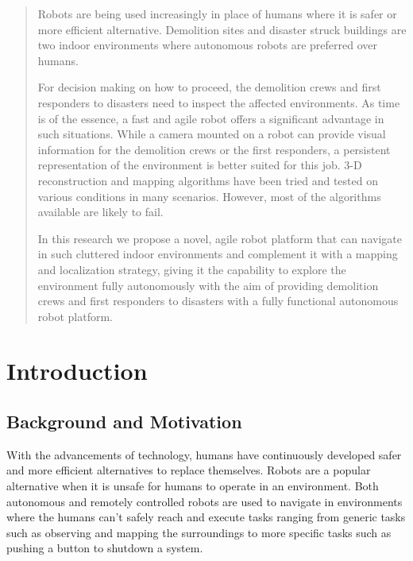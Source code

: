 \documentclass[12pt,a4paper]{report}
\begin{document}
\begin{abstract}
\par Robots are being used increasingly in place of humans where it is safer or more efficient alternative. Demolition sites and disaster struck buildings are two indoor environments where autonomous robots are preferred over humans. 

\par For decision making on how to proceed, the demolition crews and first responders to disasters need to inspect the affected environments. As time is of the essence, a fast and agile robot offers a significant advantage in such situations. While a camera mounted on a robot can provide visual information for the demolition crews or the first responders, a persistent representation of the environment is better suited for this job. 3-D reconstruction and mapping algorithms have been tried and tested on various conditions in many scenarios. However, most of the algorithms available are likely to fail.  
% 
% 

\par In this research we propose a novel, agile robot platform that can navigate in such cluttered indoor environments and complement it with a mapping and localization strategy, giving it the capability to explore the environment fully autonomously with the aim of providing demolition crews and first responders to disasters with a fully functional autonomous robot platform. 

\end{abstract}

\tableofcontents

\chapter{Introduction}

\section{Background and Motivation}
\label{background}
With the advancements of technology, humans have continuously developed safer and more efficient alternatives to replace themselves. Robots are a popular alternative when it is unsafe for humans to operate in an environment. Both autonomous and remotely controlled robots are used to navigate in environments where the humans can't safely reach and execute tasks ranging from generic tasks such as observing and mapping the surroundings to more specific tasks such as pushing a button to shutdown a system. \par
\end{document}
